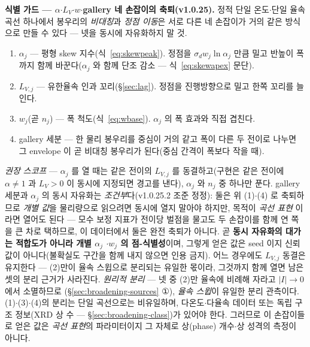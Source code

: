 \begin{warnbox}
\textbf{식별 가드 --- $\alpha$$\cdot$$L_V$$\cdot$$w$$\cdot$gallery 네 손잡이의 축퇴(v1.0.25).} 정적 단일
온도$\cdot$단일 율속 곡선 하나에서 봉우리의 \emph{비대칭}과 \emph{정점 이동}은 서로 다른 네 손잡이가
거의 같은 방식으로 만들 수 있다 --- 넷을 동시에 자유화하지 말 것.
\begin{enumerate}[label=(\arabic*),leftmargin=2.0em,itemsep=2pt]
\item $\alpha_j$ --- 평형 skew 지수(식~\eqref{eq:skewpeak}). 정점을 $\sigma_d w_j\ln\alpha_j$ 만큼 밀고
반높이 폭까지 함께 바꾼다($\alpha_j$ 와 함께 단조 감소 --- 식~\eqref{eq:skewapex} 문단).
\item $L_{V,j}$ --- 유한율속 인과 꼬리(\S\ref{sec:lag}). 정점을 진행방향으로 밀고 한쪽 꼬리를 늘인다.
\item $w_j$(곧 $n_j$) --- 폭 척도(식~\eqref{eq:wbase}). $\alpha_j$ 의 폭 효과와 직접 겹친다.
\item gallery 세분 --- 한 물리 봉우리를 중심이 거의 같고 폭이 다른 두 전이로 나누면 그 envelope 이 곧
비대칭 봉우리가 된다(중심 간격이 폭보다 작을 때).
\end{enumerate}
\emph{권장 스코프} --- $\alpha_j$ 를 열 때는 같은 전이의 $L_{V,j}$ 를 동결하고(구현은 같은 전이에
$\alpha\ne1$ 과 $L_V>0$ 이 동시에 지정되면 경고를 낸다), $\alpha_j$ 와 $n_j$ 중 하나만 푼다.
gallery 세분과 $\alpha_j$ 의 동시 자유화는 \emph{조건부}다(v1.0.25.2 조준 정정): 둘은 위 (1)$\cdot$(4)
로 축퇴하므로 \emph{개별 값}을 물리량으로 읽으려면 동시에 열지 말아야 하지만, 목적이 \emph{곡선 표현}
이라면 열어도 된다 --- 모수 보정 지표가 전이당 벌점을 물고도 두 손잡이를 함께 연 쪽을 큰 차로 택하므로,
이 데이터에서 둘은 완전 축퇴가 아니다. 곧 \textbf{동시 자유화의 대가는 적합도가 아니라 개별 $\alpha_j$
$\cdot$$w_j$ 의 점-식별성}이며, 그렇게 얻은 값은 seed 이지 신뢰값이 아니다(불확실도 구간을 함께 내지
않으면 인용 금지). 어느 경우에도 $L_{V,j}$ 동결은 유지한다 --- (2)만이 율속 스윕으로 분리되는 유일한
몫이라, 그것까지 함께 열면 남은 셋의 분리 근거가 사라진다.
\emph{원리적 분리} --- 넷 중 (2)만 율속에 비례해 자라고 $|I|\!\to\!0$ 에서 소멸하므로
(\S\ref{sec:broadening-sources} ①), \emph{율속 스윕}이 유일한 분리 관측이다. (1)$\cdot$(3)$\cdot$(4)의
분리는 단일 곡선으로는 비유일하며, 다온도$\cdot$다율속 데이터 또는 독립 구조 정보(XRD 상 수 ---
\S\ref{sec:broadening-class})가 있어야 한다. 그러므로 이 손잡이들로 얻은 값은 \emph{곡선 표현}의
파라미터이지 그 자체로 상(phase) 개수$\cdot$상 성격의 측정이 아니다.
\end{warnbox}


